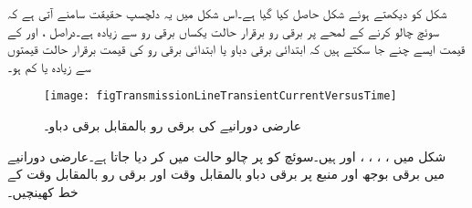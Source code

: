 شکل  کو دیکھتے ہوئے شکل  حاصل کیا گیا ہے۔اس شکل میں یہ دلچسپ حقیقت  سامنے آتی ہے کہ سوئچ چالو کرنے کے لمحے پر برقی رو برقرار حالت یکساں برقی رو سے زیادہ ہے۔دراصل ،  اور  کے قیمت ایسے چنے جا سکتے ہیں کہ ابتدائی برقی دباو یا ابتدائی برقی رو کی قیمت برقرار حالت قیمتوں سے زیادہ یا کم ہو۔
\begin{figure}
\centering
\texttt{[image: figTransmissionLineTransientCurrentVersusTime]}
\caption{عارضی دورانیے کی برقی رو بالمقابل برقی دباو۔}
\label{شکل_ترسیلی_عارضی_برقی_رو_بالمقابل_وقت}
\end{figure}

شکل  میں ، ، ، ،  اور  ہیں۔سوئچ کو  پر چالو حالت میں کر دیا جاتا ہے۔عارضی دورانیے میں برقی بوجھ اور منبع  پر برقی دباو بالمقابل وقت اور  برقی رو بالمقابل وقت کے خط کھینچیں۔

